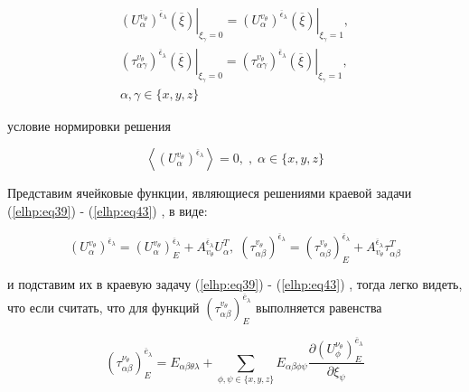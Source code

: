 \begin{equation}
    \label{elhp:eq42}
    \begin{gathered}
    \left.  \left( U_{\alpha}^{v_{\theta}} \right)^{ \overline{\epsilon}_{\lambda}} \left( \overline{\xi}  \right)   \right|_{\xi_{\gamma} = 0}
    =
    \left.  \left( U_{\alpha}^{v_{\theta}} \right)^{ \overline{\epsilon}_{\lambda}} \left( \overline{\xi}  \right)   \right|_{\xi_{\gamma} = 1}
    , \\
    \left.  \left( \tau_{\alpha \gamma}^{v_{\theta}} \right)^{ \overline{\epsilon}_{\lambda}} \left( \overline{\xi}  \right)   \right|_{\xi_{\gamma} = 0}
    =
    \left.  \left( \tau_{\alpha \gamma}^{v_{\theta}} \right)^{ \overline{\epsilon}_{\lambda}} \left( \overline{\xi}  \right)   \right|_{\xi_{\gamma} = 1}
    , \\
    \alpha, \gamma \in \{x,y,z\} 
    \end{gathered}
\end{equation}

условие нормировки решения

\begin{equation}
    \label{elhp:eq43}
    \left< \left( U_{\alpha}^{v_{\theta}} \right)^{ \overline{\epsilon}_{\lambda}}  \right> = 0 ,\; , \; \alpha \in \{x,y,z\}
\end{equation}

Представим ячейковые функции, являющиеся решениями краевой задачи 
(\ref{elhp:eq39})
-
(\ref{elhp:eq43})
, в виде:

\begin{equation}
    \label{elhp:eq44}
    \left( U_{\alpha}^{v_{\theta}} \right)^{ \overline{\epsilon}_{\lambda}} =
    \left( U_{\alpha}^{v_{\theta}} \right)^{ \overline{\epsilon}_{\lambda}}_E +
    A_{v_{\theta}}^{ \overline{\epsilon}_{\lambda}}
    U_{\alpha}^T
    ,\;
    \left( \tau_{\alpha\beta}^{v_{\theta}} \right)^{ \overline{\epsilon}_{\lambda}} =
    \left( \tau_{\alpha\beta}^{v_{\theta}} \right)^{ \overline{\epsilon}_{\lambda}}_E +
    A_{v_{\theta}}^{ \overline{\epsilon}_{\lambda}}
    \tau_{\alpha\beta}^T
\end{equation}

и подставим их в краевую задачу 
(\ref{elhp:eq39})
-
(\ref{elhp:eq43})
, тогда легко видеть, что если считать, что для функций 
$\left( \tau_{ \alpha\beta}^{ v_{\theta}} \right)_E^{ \overline{e}_{\lambda}}$
выполняется равенства

\begin{equation}
    \label{elhp:eq45}
    \left( \tau_{\alpha\beta}^{\nu_{\theta}} \right)_E^{ \overline{e}_{\lambda} }  =
    E_{\alpha\beta\theta\lambda} + \sum_{ \phi,\psi \in \{x,y,z\} } 
    E_{\alpha\beta\phi\psi} \frac{ \partial \left( U_{\phi}^{\nu_{\theta}} \right)_E^{\overline{e}_{\lambda}} }
    { \partial \xi_{\psi}}
\end{equation}

